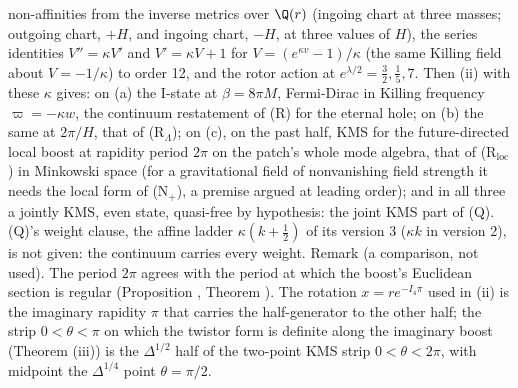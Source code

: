 non-affinities from the inverse metrics over $\Q(r)$ (ingoing chart at three masses; outgoing chart, $+H$, and ingoing chart, $-H$, at three values of $H$), the series identities $V'' = \kappa V'$ and $V' = \kappa V + 1$ for $V = (e^{\kappa v} - 1)/\kappa$ (the same Killing field about $V = -1/\kappa$) to order 12, and the rotor action at $e^{\lambda/2} = \tfrac32, \tfrac15, 7$. Then (ii) with these $\kappa$ gives: on (a) the I-state at $\beta = 8\pi M$, Fermi-Dirac in Killing frequency $\varpi = -\kappa w$, the continuum restatement of (R) for the eternal hole; on (b) the same at $2\pi/H$, that of (R$_{\Lambda}$); on (c), on the past half, KMS for the future-directed local boost at rapidity period $2\pi$ on the patch's whole mode algebra, that of (R$_{\mathrm{loc}}$) in Minkowski space (for a gravitational field of nonvanishing field strength it needs the local form of (N$_{+}$), a premise argued at leading order); and in all three a jointly KMS, even state, quasi-free by hypothesis: the joint KMS part of (Q). (Q)'s weight clause, the affine ladder $\kappa(k + \tfrac12)$ of its version 3 ($\kappa k$ in version 2), is not given: the continuum carries every weight. Remark (a comparison, not used). The period $2\pi$ agrees with the period at which the boost's Euclidean section is regular (Proposition , Theorem ). The rotation $x = re^{-I_{4}\pi}$ used in (ii) is the imaginary rapidity $\pi$ that carries the half-generator to the other half; the strip $0 < \theta < \pi$ on which the twistor form is definite along the imaginary boost (Theorem (iii)) is the $\Delta^{1/2}$ half of the two-point KMS strip $0 < \theta < 2\pi$, with midpoint the $\Delta^{1/4}$ point $\theta = \pi/2$.

